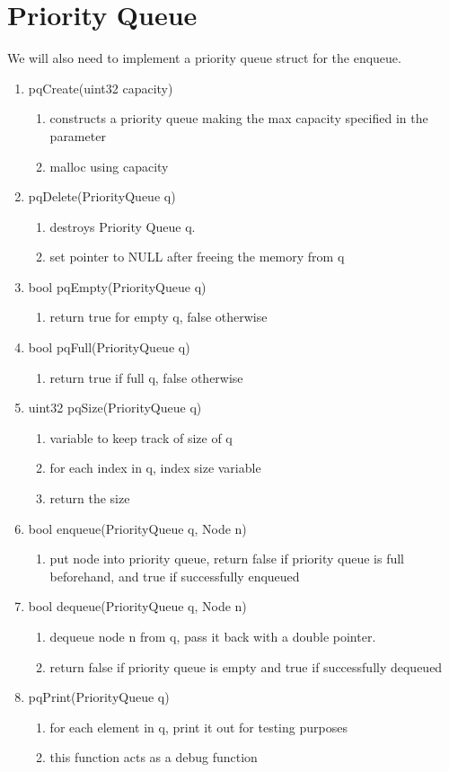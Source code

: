 \documentclass[11pt]{article}
\begin{document}
\section{Priority Queue}\label{ss:Prio}
We will also need to implement a priority queue struct for the enqueue.
\begin{enumerate}
\item pqCreate(uint32 capacity)
	\begin{enumerate}
	\item constructs a priority queue making the max capacity specified in the parameter
	\item malloc using capacity
	\end{enumerate}
\item pqDelete(PriorityQueue q)
	\begin{enumerate}
	\item destroys Priority Queue q.
	\item set pointer to NULL after freeing the memory from q
	\end{enumerate}
\item bool pqEmpty(PriorityQueue q)
	\begin{enumerate}
	\item return true for empty q, false otherwise
	\end{enumerate}
\item bool pqFull(PriorityQueue q)
	\begin{enumerate}
	\item return true if full q, false otherwise
	\end{enumerate}
\item uint32 pqSize(PriorityQueue q)
	\begin{enumerate}
	\item variable to keep track of size of q
	\item for each index in q, index size variable
	\item return the size
	\end{enumerate}
\item bool enqueue(PriorityQueue q, Node n)
	\begin{enumerate}
	\item put node into priority queue, return false if priority queue is full beforehand, and true if successfully enqueued
	\end{enumerate}
\item bool dequeue(PriorityQueue q, Node n)
	\begin{enumerate}
	\item dequeue node n from q, pass it back with a double pointer.
	\item return false if priority queue is empty and true if successfully dequeued
	\end{enumerate}
\item pqPrint(PriorityQueue q)
	\begin{enumerate}
	\item for each element in q, print it out for testing purposes
	\item this function acts as a debug function
	\end{enumerate}
\end{enumerate}
\end{document}

